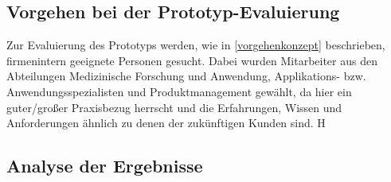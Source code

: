 \subsection{Vorgehen bei der Prototyp-Evaluierung}
Zur Evaluierung des Prototyps werden, wie in \ref{vorgehenkonzept} beschrieben, firmenintern geeignete Personen gesucht. 
Dabei wurden Mitarbeiter aus den Abteilungen Medizinische Forschung und Anwendung, Applikations- bzw. Anwendungsspezialisten und Produktmanagement gewählt, da hier ein guter/großer Praxisbezug herrscht und die Erfahrungen, Wissen und Anforderungen ähnlich zu denen der zukünftigen Kunden sind.
H



\subsection{Analyse der Ergebnisse}
